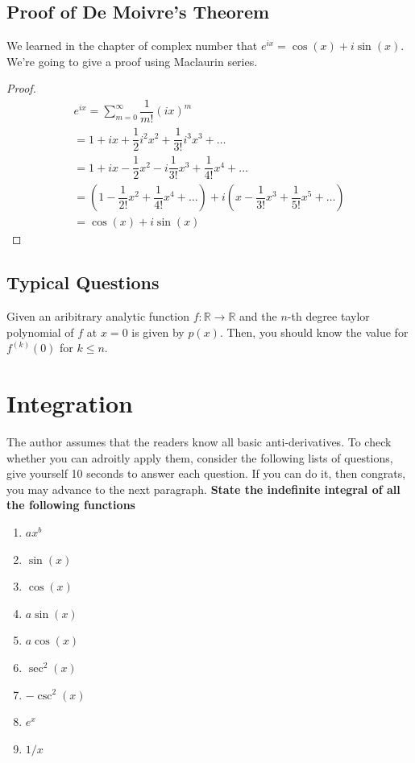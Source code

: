 \documentclass{article}
\theoremstyle{definition}
\theoremstyle{definition}
\theoremstyle{definition}
\theoremstyle{definition}
\theoremstyle{definition}
\theoremstyle{definition}
\theoremstyle{definition}
\theoremstyle{definition}
\theoremstyle{definition}
\begin{document}
\subsection{Proof of De Moivre's Theorem}
We learned in the chapter of complex number that $e^{ix}=\cos(x)+i\sin(x)$. We're going to give a proof using Maclaurin series.
\begin{proof}
\begin{align*}
    e^{ix}=\sum_{m=0}^\infty\dfrac{1}{m!}(ix)^m\\
    =1+ix+\dfrac{1}{2}i^2x^2+\dfrac{1}{3!}i^3x^3+\ldots\\
    =1+ix-\dfrac{1}{2}x^2-i\dfrac{1}{3!}x^3+\dfrac{1}{4!}x^4+\ldots\\
    =\left(1-\dfrac{1}{2!}x^2+\dfrac{1}{4!}x^4+\ldots\right)+i\left(x-\dfrac{1}{3!}x^3+\dfrac{1}{5!}x^5+\ldots\right)\\
    =\cos(x)+i\sin(x)
\end{align*}
\end{proof}

\subsection{Typical Questions}
Given an aribitrary analytic function $f:\mathbb{R}\to\mathbb{R}$ and the $n$-th degree taylor polynomial of $f$ at $x=0$ is given by $p(x)$. Then, you should know the value for $f^{(k)}(0)$ for $k\le n$.

\section{Integration}
The author assumes that the readers know all basic anti-derivatives. To check whether you can adroitly apply them, consider the following lists of questions, give yourself 10 seconds to answer each question. If you can do it, then congrats, you may advance to the next paragraph.
\textbf{State the indefinite integral of all the following functions}
\begin{enumerate}
    \item $ax^b$
    \item $\sin(x)$
    \item $\cos(x)$
    \item $a\sin(x)$
    \item $a\cos(x)$
    \item $\sec^2(x)$
    \item $-\csc^2(x)$
    \item $e^x$
    \item $1/x$
\end{enumerate}
\end{document}
